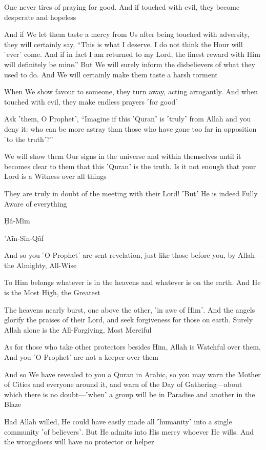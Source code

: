 One never tires of praying for good. And if touched with evil, they become desperate and hopeless

And if We let them taste a mercy from Us after being touched with adversity, they will certainly say, “This is what I deserve. I do not think the Hour will ˹ever˺ come. And if in fact I am returned to my Lord, the finest reward with Him will definitely be mine.” But We will surely inform the disbelievers of what they used to do. And We will certainly make them taste a harsh torment

When We show favour to someone, they turn away, acting arrogantly. And when touched with evil, they make endless prayers ˹for good˺

Ask ˹them, O Prophet˺, “Imagine if this ˹Quran˺ is ˹truly˺ from Allah and you deny it: who can be more astray than those who have gone too far in opposition ˹to the truth˺?”

We will show them Our signs in the universe and within themselves until it becomes clear to them that this ˹Quran˺ is the truth. Is it not enough that your Lord is a Witness over all things

They are truly in doubt of the meeting with their Lord! ˹But˺ He is indeed Fully Aware of everything

Ḥâ-Mĩm

’Aĩn-Sĩn-Qãf

And so you ˹O Prophet˺ are sent revelation, just like those before you, by Allah—the Almighty, All-Wise

To Him belongs whatever is in the heavens and whatever is on the earth. And He is the Most High, the Greatest

The heavens nearly burst, one above the other, ˹in awe of Him˺. And the angels glorify the praises of their Lord, and seek forgiveness for those on earth. Surely Allah alone is the All-Forgiving, Most Merciful

As for those who take other protectors besides Him, Allah is Watchful over them. And you ˹O Prophet˺ are not a keeper over them

And so We have revealed to you a Quran in Arabic, so you may warn the Mother of Cities and everyone around it, and warn of the Day of Gathering—about which there is no doubt—˹when˺ a group will be in Paradise and another in the Blaze

Had Allah willed, He could have easily made all ˹humanity˺ into a single community ˹of believers˺. But He admits into His mercy whoever He wills. And the wrongdoers will have no protector or helper

